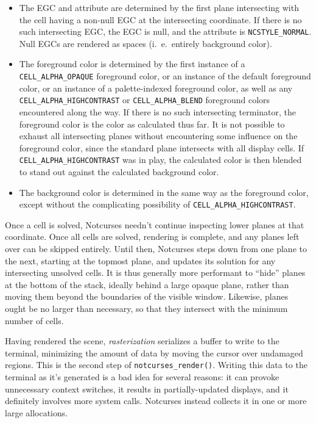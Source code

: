 \documentclass[letterpaper,10pt]{article}
\newenvironment{denseitemize}{
  \begin{itemize}
      \setlength{\itemsep}{0pt}
}{
  \end{itemize}
}
\begin{document}
\begin{denseitemize}
\item{The EGC and attribute are determined by the first plane intersecting with
      the cell having a non-null EGC at the intersecting coordinate. If there is
    no such intersecting EGC, the EGC is null, and the attribute is
    \texttt{NCSTYLE\_NORMAL}.} Null EGCs are rendered as spaces (i.\ e.\ entirely
    background color).
\item{The foreground color is determined by the first instance of a
    \texttt{CELL\_ALPHA\_OPAQUE} foreground color, or an instance of the
    default foreground color, or an instance of a palette-indexed foreground
    color, as well as any \texttt{CELL\_ALPHA\_HIGHCONTRAST} or \texttt{CELL\_ALPHA\_BLEND}
    foreground colors encountered along the way. If there is no such intersecting
    terminator, the foreground color is the color as calculated thus far. It is
    not possible to exhaust all intersecting planes without encountering some
    influence on the foreground color, since the standard plane intersects with
    all display cells. If \texttt{CELL\_ALPHA\_HIGHCONTRAST} was in play, the
    calculated color is then blended to stand out against the calculated background
    color.}
\item{The background color is determined in the same way as the foreground color,
    except without the complicating possibility of \texttt{CELL\_ALPHA\_HIGHCONTRAST}.}
\end{denseitemize}

Once a cell is solved, Notcurses needn't continue inspecting lower planes at
that coordinate. Once all cells are solved, rendering is complete, and any
planes left over can be skipped entirely. Until then, Notcurses steps down from
one plane to the next, starting at the topmost plane, and updates its solution
for any intersecting unsolved cells. It is thus generally more performant to
``hide'' planes at the bottom of the stack, ideally behind a large opaque plane,
rather than moving them beyond the boundaries of the visible window. Likewise,
planes ought be no larger than necessary, so that they intersect with the
minimum number of cells.

Having rendered the scene, \textit{rasterization} serializes a buffer to write
to the terminal, minimizing the amount of data by moving the cursor over undamaged
regions. This is the second step of \texttt{notcurses\_render()}. Writing this
data to the terminal as it's generated is a bad idea for several reasons: it can
provoke unnecessary context switches, it results in partially-updated displays,
and it definitely involves more system calls. Notcurses instead collects it in
one or more large allocations.
\end{document}
